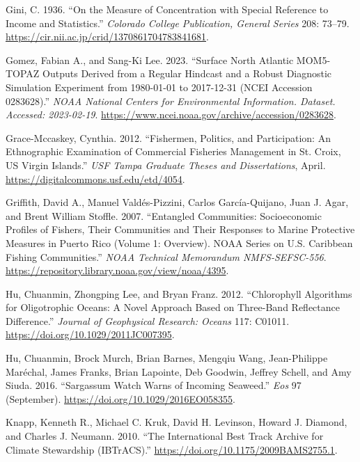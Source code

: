 \documentclass[
  letterpaper,
  oneside,
  open=any]{scrbook}
\newlength{\cslhangindent}
\newenvironment{CSLReferences}[2] %
 {\begin{list}{}{%
  \setlength{\itemindent}{0pt}
  \setlength{\leftmargin}{0pt}
  \setlength{\parsep}{0pt}
  \ifodd #1
   \setlength{\leftmargin}{\cslhangindent}
   \setlength{\itemindent}{-1\cslhangindent}
  \fi
  \setlength{\itemsep}{#2\baselineskip}}}
 {\end{list}}
\begin{document}
\begin{CSLReferences}{1}{0}
Gini, C. 1936. {``On the Measure of Concentration with Special Reference
to Income and Statistics.''} \emph{Colorado College Publication, General
Series} 208: 73--79.
\url{https://cir.nii.ac.jp/crid/1370861704783841681}.

Gomez, Fabian A., and Sang-Ki Lee. 2023. {``Surface North Atlantic
MOM5-TOPAZ Outputs Derived from a Regular Hindcast and a Robust
Diagnostic Simulation Experiment from 1980-01-01 to 2017-12-31 (NCEI
Accession 0283628).''} \emph{NOAA National Centers for Environmental
Information. Dataset. Accessed: 2023-02-19}.
\url{https://www.ncei.noaa.gov/archive/accession/0283628}.

Grace-Mccaskey, Cynthia. 2012. {``Fishermen, Politics, and
Participation: An Ethnographic Examination of Commercial Fisheries
Management in St. Croix, US Virgin Islands.''} \emph{USF Tampa Graduate
Theses and Dissertations}, April.
\url{https://digitalcommons.usf.edu/etd/4054}.

Griffith, David A., Manuel Valdés-Pizzini, Carlos García-Quijano, Juan
J. Agar, and Brent William Stoffle. 2007. {``Entangled Communities:
Socioeconomic Profiles of Fishers, Their Communities and Their Responses
to Marine Protective Measures in Puerto Rico (Volume 1: Overview). NOAA
Series on U.S. Caribbean Fishing Communities.''} \emph{NOAA Technical
Memorandum NMFS-SEFSC-556}.
\url{https://repository.library.noaa.gov/view/noaa/4395}.

Hu, Chuanmin, Zhongping Lee, and Bryan Franz. 2012. {``Chlorophyll
Algorithms for Oligotrophic Oceans: A Novel Approach Based on Three-Band
Reflectance Difference.''} \emph{Journal of Geophysical Research:
Oceans} 117: C01011. \url{https://doi.org/10.1029/2011JC007395}.

Hu, Chuanmin, Brock Murch, Brian Barnes, Mengqiu Wang, Jean-Philippe
Maréchal, James Franks, Brian Lapointe, Deb Goodwin, Jeffrey Schell, and
Amy Siuda. 2016. {``Sargassum Watch Warns of Incoming Seaweed.''}
\emph{Eos} 97 (September). \url{https://doi.org/10.1029/2016EO058355}.

Knapp, Kenneth R., Michael C. Kruk, David H. Levinson, Howard J.
Diamond, and Charles J. Neumann. 2010. {``The International Best Track
Archive for Climate Stewardship (IBTrACS).''}
\url{https://doi.org/10.1175/2009BAMS2755.1}.


\end{CSLReferences}
\end{document}
